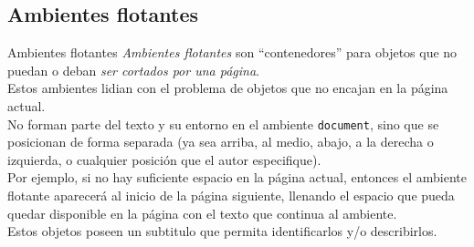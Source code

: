 \documentclass[../slides.tex]{subfiles}
\begin{document}
    
    \subsection{Ambientes flotantes}
    
    \begin{frame}{Ambientes flotantes}
        \emph{Ambientes flotantes} son ``contenedores'' para objetos que no puedan o deban \emph{ser cortados por una página}.\\[\baselineskip]

        Estos ambientes lidian con el problema de objetos que no encajan en la página actual.\\[\baselineskip]

        No forman parte del texto y su entorno en el ambiente \texttt{document}, sino que se posicionan de forma separada (ya sea arriba, al medio, abajo, a la derecha o izquierda, o cualquier posición que el autor especifique).\\[\baselineskip]

        Por ejemplo, si no hay suficiente espacio en la página actual, entonces el ambiente flotante aparecerá al inicio de la página siguiente, llenando el espacio que pueda quedar disponible en la página con el texto que continua al ambiente.\\[\baselineskip]
        
        Estos objetos poseen un subtitulo que permita identificarlos y/o describirlos.
    \end{frame}
\end{document}
